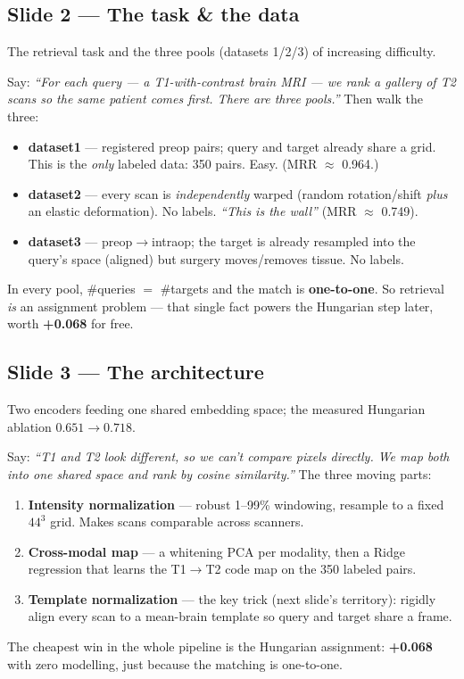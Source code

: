 \documentclass[12pt,a4paper]{article}
\begin{document}
\subsection{Slide 2 — The task \& the data}
\begin{system}
The retrieval task and the three pools (datasets 1/2/3) of increasing difficulty.
\end{system}
Say: \emph{``For each query — a T1-with-contrast brain MRI — we rank a gallery of T2
scans so the same patient comes first. There are three pools.''} Then walk the three:
\begin{itemize}
\item \textbf{dataset1} — registered preop pairs; query and target already share a grid.
  This is the \emph{only} labeled data: 350 pairs. Easy. (MRR $\approx$ 0.964.)
\item \textbf{dataset2} — every scan is \emph{independently} warped (random rotation/shift
  \emph{plus} an elastic deformation). No labels. \emph{``This is the wall''} (MRR $\approx$ 0.749).
\item \textbf{dataset3} — preop$\rightarrow$intraop; the target is already resampled into
  the query's space (aligned) but surgery moves/removes tissue. No labels.
\end{itemize}
\begin{mathidea}
In every pool, \#queries $=$ \#targets and the match is \textbf{one-to-one}. So retrieval
\emph{is} an assignment problem — that single fact powers the Hungarian step later, worth
\textbf{+0.068} for free.
\end{mathidea}

\subsection{Slide 3 — The architecture}
\begin{system}
Two encoders feeding one shared embedding space; the measured Hungarian ablation
$0.651 \rightarrow 0.718$.
\end{system}
Say: \emph{``T1 and T2 look different, so we can't compare pixels directly. We map both
into one shared space and rank by cosine similarity.''} The three moving parts:
\begin{enumerate}
\item \textbf{Intensity normalization} — robust 1--99\% windowing, resample to a fixed
  $44^3$ grid. Makes scans comparable across scanners.
\item \textbf{Cross-modal map} — a whitening PCA per modality, then a Ridge regression
  that learns the T1$\rightarrow$T2 code map on the 350 labeled pairs.
\item \textbf{Template normalization} — the key trick (next slide's territory): rigidly
  align every scan to a mean-brain template so query and target share a frame.
\end{enumerate}
\begin{funfact}
The cheapest win in the whole pipeline is the Hungarian assignment: \textbf{+0.068} with
zero modelling, just because the matching is one-to-one.
\end{funfact}
\end{document}

